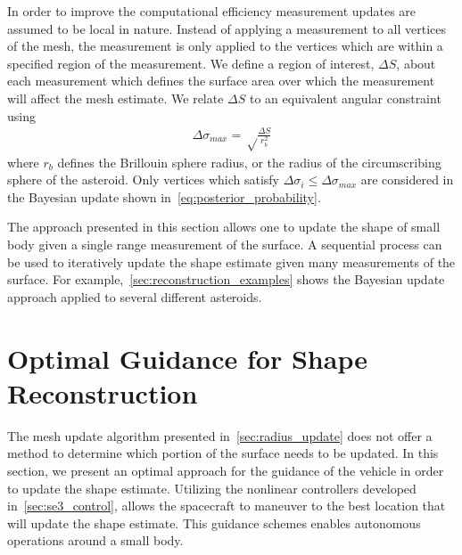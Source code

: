 In order to improve the computational efficiency measurement updates are assumed to be local in nature.
Instead of applying a measurement to all vertices of the mesh, the measurement is only applied to the vertices which are within a specified region of the measurement. 
We define a region of interest, \( \Delta S \), about each measurement which defines the surface area over which the measurement will affect the mesh estimate.
We relate \( \Delta S \) to an equivalent angular constraint using
\begin{align}\label{eq:region_of_interest}
    \Delta \sigma_{max} = \sqrt \frac{\Delta S}{r_b^2}
\end{align}
where \( r_b \) defines the Brillouin  sphere radius, or the radius of the circumscribing sphere of the asteroid.
Only vertices which satisfy \( \Delta \sigma_i \leq \Delta \sigma_{max} \) are considered in the Bayesian update shown in~\cref{eq:posterior_probability}.

The approach presented in this section allows one to update the shape of small body given a single range measurement of the surface.
A sequential process can be used to iteratively update the shape estimate given many measurements of the surface. 
For example,~\cref{sec:reconstruction_examples} shows the Bayesian update approach applied to several different asteroids.

\section{Optimal Guidance for Shape Reconstruction}\label{sec:explore_asteroid}

The mesh update algorithm presented in~\cref{sec:radius_update} does not offer a method to determine which portion of the surface needs to be updated. 
In this section, we present an optimal approach for the guidance of the vehicle in order to update the shape estimate.
Utilizing the nonlinear controllers developed in~\cref{sec:se3_control}, allows the spacecraft to maneuver to the best location that will update the shape estimate.
This guidance schemes enables autonomous operations around a small body.

